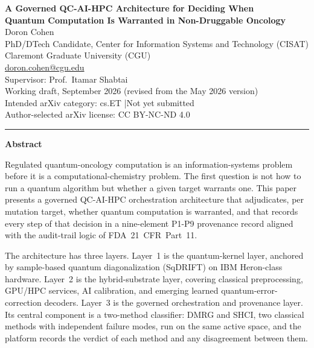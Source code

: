 \documentclass[11pt,letterpaper]{article}
\begin{document}
\begin{center}
{\Large\bfseries A Governed QC-AI-HPC Architecture for Deciding When\\
Quantum Computation Is Warranted in Non-Druggable Oncology}\\[10pt]
{\normalsize Doron Cohen}\\
{\small PhD/DTech Candidate, Center for Information Systems and Technology (CISAT)\\
Claremont Graduate University (CGU)\\
\href{mailto:doron.cohen@cgu.edu}{doron.cohen@cgu.edu}\\
Supervisor: Prof.\ Itamar Shabtai}\\[6pt]
{\small Working draft, September 2026 (revised from the May 2026 version)}\\
{\small Intended arXiv category: cs.ET \quad|\quad Not yet submitted}\\
{\small Author-selected arXiv license: CC BY-NC-ND 4.0}
\end{center}

\noindent\rule{\textwidth}{0.4pt}

\begin{center}\textbf{Abstract}\end{center}

Regulated quantum-oncology computation is an information-systems problem before it is a
computational-chemistry problem.  The first question is not how to run a quantum algorithm
but whether a given target warrants one.  This paper presents a governed QC-AI-HPC
orchestration architecture that adjudicates, per mutation target, whether quantum computation
is warranted, and that records every step of that decision in a nine-element P1-P9 provenance
record aligned with the audit-trail logic of FDA~21~CFR~Part~11.

The architecture has three layers.  Layer~1 is the quantum-kernel layer, anchored by
sample-based quantum diagonalization (SqDRIFT) on IBM Heron-class hardware.  Layer~2 is the
hybrid-substrate layer, covering classical preprocessing, GPU/HPC services, AI calibration,
and emerging learned quantum-error-correction decoders.  Layer~3 is the governed
orchestration and provenance layer.  Its central component is a two-method classifier:
DMRG and SHCI, two classical methods with independent failure modes, run on the same active
space, and the platform records the verdict of each method and any disagreement between them.
\end{document}
